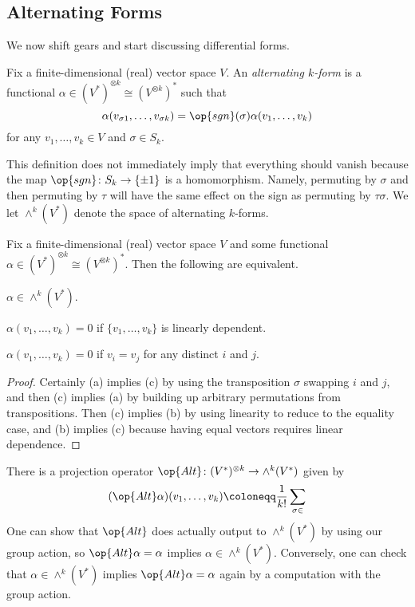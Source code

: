 \documentclass[../notes.tex]{subfiles}
\begin{document}
\subsection{Alternating Forms}
We now shift gears and start discussing differential forms.
\begin{definition}[alternating]
	Fix a finite-dimensional (real) vector space $V$. An \textit{alternating $k$-form} is a functional $\alpha\in(V^{*})^{\otimes k}\cong\left(V^{\otimes k}\right)^*$ such that
	\[\alpha(v_{\sigma1},\ldots,v_{\sigma k})=\op{sgn}(\sigma)\alpha(v_1,\ldots,v_k)\]
	for any $v_1,\ldots,v_k\in V$ and $\sigma\in S_k$.
\end{definition}
\begin{remark}
	This definition does not immediately imply that everything should vanish because the map $\op{sgn}\colon S_k\to\{\pm1\}$ is a homomorphism. Namely, permuting by $\sigma$ and then permuting by $\tau$ will have the same effect on the sign as permuting by $\tau\sigma$. We let $\land^k(V^*)$ denote the space of alternating $k$-forms.
\end{remark}
\begin{lemma}
	Fix a finite-dimensional (real) vector space $V$ and some functional  $\alpha\in(V^{*})^{\otimes k}\cong\left(V^{\otimes k}\right)^*$. Then the following are equivalent.
	\begin{listroman}
		\item $\alpha\in\land^k(V^*)$.
		\item $\alpha(v_1,\ldots,v_k)=0$ if $\{v_1,\ldots,v_k\}$ is linearly dependent.
		\item $\alpha(v_1,\ldots,v_k)=0$ if $v_i=v_j$ for any distinct $i$ and $j$.
	\end{listroman}
\end{lemma}
\begin{proof}
	Certainly (a) implies (c) by using the transposition $\sigma$ swapping $i$ and $j$, and then (c) implies (a) by building up arbitrary permutations from transpositions. Then (c) implies (b) by using linearity to reduce to the equality case, and (b) implies (c) because having equal vectors requires linear dependence.
\end{proof}
\begin{remark}
	There is a projection operator $\op{Alt}\colon(V^*)^{\otimes k}\to\land^k(V^*)$ given by
	\[(\op{Alt}\alpha)(v_1,\ldots,v_k)\coloneqq\frac1{k!}\sum_{\sigma\in}\]
	One can show that $\op{Alt}$ does actually output to $\land^k(V^*)$ by using our group action, so $\op{Alt}\alpha=\alpha$ implies $\alpha\in\land^k(V^*)$. Conversely, one can check that $\alpha\in\land^k(V^*)$ implies $\op{Alt}\alpha=\alpha$ again by a computation with the group action.
\end{remark}
\end{document}
